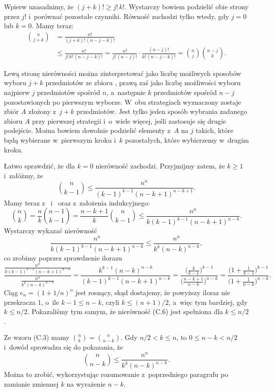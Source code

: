 \exercise %
Wpierw uzasadnimy, że $(j+k)!\ge j!\,k!$.
Wystarczy bowiem podzielić obie strony przez $j!$ i~porównać pozostałe czynniki.
Równość zachodzi tylko wtedy, gdy $j=0$ lub $k=0$.
Mamy teraz:
\begin{align*}
	\binom{n}{j+k} &= \frac{n!}{(j+k)!\,(n-j-k)!} \\
	&\le \frac{n!}{j!\,k!\,(n-j-k)!} = \frac{n!}{j!\,(n-j)!}\cdot\frac{(n-j)!}{k!\,(n-j-k)!} = \binom{n}{j}\binom{n-j}{k}.
\end{align*}

Lewą stronę nierówności można zinterpretować jako liczbę możliwych sposobów wyboru $j+k$ przedmiotów ze zbioru , prawą zaś jako liczbę możliwości wyboru najpierw $j$ przedmiotów spośród $n$, a~następnie $k$ przedmiotów spośród $n-j$ pozostawionych po pierwszym wyborze.
W~obu strategiach wyznaczony zostaje zbiór $A$ złożony z~$j+k$ przedmiotów.
Jest tylko jeden sposób wybrania zadanego zbioru $A$ przy pierwszej strategii i~o~wiele więcej, jeśli zastosuje się drugie podejście.
Można bowiem dowolnie podzielić elementy z~$A$ na $j$ takich, które będą wybierane w~pierwszym kroku i~$k$ pozostałych, które wybierzemy w~drugim kroku.

\exercise %
Łatwo sprawdzić, że dla $k=0$ nierówność zachodzi.
Przyjmijmy zatem, że $k\ge1$ i~załóżmy, że
\[
	\binom{n}{k-1} \le \frac{n^n}{(k-1)^{k-1}(n-k+1)^{n-k+1}}.
\]
Mamy teraz z~ i~ oraz z~założenia indukcyjnego:
\[
	\binom{n}{k} = \frac{n}{k}\binom{n-1}{k-1} = \frac{n-k+1}{k}\binom{n}{k-1} \le \frac{n^n}{k(k-1)^{k-1}(n-k+1)^{n-k}}.
\]
Wystarczy wykazać nierówność
\[
	\frac{n^n}{k(k-1)^{k-1}(n-k+1)^{n-k}} \le \frac{n^n}{k^k(n-k)^{n-k}},
\]
co zrobimy poprzez sprawdzenie ilorazu
\[
	\frac{\frac{n^n}{k(k-1)^{k-1}(n-k+1)^{n-k}}}{\frac{n^n}{k^k(n-k)^{n-k}}} = \frac{k^{k-1}(n-k)^{n-k}}{(k-1)^{k-1}(n-k+1)^{n-k}} = \frac{\bigl(\frac{k}{k-1}\bigr)^{k-1}}{\bigl(\frac{n-k+1}{n-k}\bigr)^{n-k}} = \frac{\bigl(1+\frac{1}{k-1}\bigr)^{k-1}}{\bigl(1+\frac{1}{n-k}\bigr)^{n-k}}.
\]
Ciąg $e_n={(1+1/n)}^n$ jest rosnący, skąd dostajemy, że powyższy iloraz nie przekracza 1, o~ile $k-1\le n-k$, czyli $k\le(n+1)/2$, a~więc tym bardziej, gdy $k\le n/2$.
Pokazaliśmy tym samym, że nierówność (C.6) jest spełniona dla $k\le n/2$.

Ze wzoru (C.3) mamy $\binom{n}{k}=\binom{n}{n-k}$.
Gdy $n/2<k\le n$, to $0\le n-k<n/2$ i~dowód sprowadza się do pokazania, że
\[
	\binom{n}{n-k} \le \frac{n^n}{k^k(n-k)^{n-k}}.
\]
Można to zrobić, wykorzystując rozumowanie z~poprzedniego paragrafu po zamianie zmiennej $k$ na wyrażenie $n-k$.

